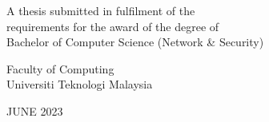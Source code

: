 \documentclass[../index.tex]{subfiles}
\begin{document}
\clearpage
\pagestyle{empty}


\begin{center}

  \smallskip

  \large{\MakeUppercase{\thetitle}}


  \vfill

  \large{\MakeUppercase{\theauthor}}

  \vfill

  A thesis submitted in fulfilment of the \\
  requirements for the award of the degree of \\
  Bachelor of Computer Science (Network \& Security) \\

  \bigskip
  \bigskip
  \bigskip

  Faculty of Computing \\
  Universiti Teknologi Malaysia \\

  \vfill

  \large{ 
    \uppercase{
      JUNE 2023\\
    }
  }

\end{center}

\clearpage
\end{document}
